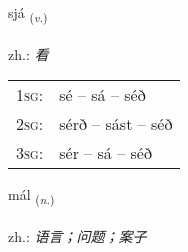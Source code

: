 \documentclass[frontgrid, backgrid]{flacards}\usepackage[]{graphicx}\usepackage[]{xcolor}
\begin{document}
{sjá \small{\textsubscript{(\textit{v.})}} \\[1ex] %
\textphonetic{[sjauː]} \\
zh.: \emph{看} \\  [2ex]
\renewcommand*{\arraystretch}{0.8}
\begin{tabular}{p{1cm}l}
\textsc{1sg}: & sé -- sá -- séð \\ 
\textsc{2sg}: & sérð -- sást -- séð \\ 
\textsc{3sg}: & sér -- sá -- séð \\ 
\end{tabular}
}

\renewcommand{\flhead}{\vskip5pt \fboxsep=0pt {\small\bfseries\footnotesize Nafnorð | 名词}}
\renewcommand{\fcfoot}{\vskip5pt \fboxsep=0pt \hspace{2pt}{\small\bfseries\footnotesize 1K}}

\renewcommand{\blhead}{\vskip5pt {\small\bfseries\footnotesize Nafnorð | 名词 }}
\renewcommand{\bcfoot}{\vskip5pt \hspace{2pt}{\small\bfseries\footnotesize 1K}}


{mál \small{\textsubscript{(\textit{n.})}} \\[1ex] %
\textphonetic{[mauːl]} \\
zh.: \emph{语言；问题；案子} \\  [2ex]
\renewcommand*{\arraystretch}{0.8}
}

\renewcommand{\flhead}{\vskip5pt \fboxsep=0pt {\small\bfseries\footnotesize Atviksorð | 副词}}
\renewcommand{\fcfoot}{\vskip5pt \fboxsep=0pt \hspace{2pt}{\small\bfseries\footnotesize 1K}}

\renewcommand{\blhead}{\vskip5pt {\small\bfseries\footnotesize Atviksorð | 副词 }}
\renewcommand{\bcfoot}{\vskip5pt \hspace{2pt}{\small\bfseries\footnotesize 1K}}
\end{document}
